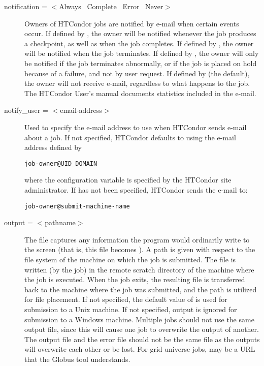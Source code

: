 \begin{description}

\label{man-condor-submit-notification}
\item[notification = $<$Always \Bar\ Complete \Bar\ Error \Bar\ Never$>$]
Owners of HTCondor jobs are notified by
e-mail when certain events occur.
If defined by , the owner will be notified
whenever the job produces a checkpoint, as well as when the job completes.
If defined by , the owner will
be notified when the job terminates.
If defined by , the owner will only be notified
if the job terminates abnormally,
or if the job is placed on hold because of a failure, and not by user request.
If defined by  (the default), the owner will not receive e-mail,
regardless to what happens to the job.
The HTCondor User's manual documents statistics included in the e-mail.


\label{man-condor-submit-notify-user}
\item[notify\_user = $<$email-address$>$]
Used to specify the e-mail
address to use when HTCondor sends e-mail about a job.  If not specified,
HTCondor defaults to using the e-mail address defined by
\begin{verbatim}
job-owner@UID_DOMAIN
\end{verbatim}
where the configuration variable 
is specified by the HTCondor site administrator.
If  has not been specified,
HTCondor sends the e-mail to:
\begin{verbatim}
job-owner@submit-machine-name
\end{verbatim}


\label{man-condor-submit-output}
\item[output = $<$pathname$>$]
The  file captures
any information the program would ordinarily write to the screen
(that is, this file becomes ).
A path is given with respect to the file system of the machine
on which the job is submitted.
The file is written (by the job)
in the remote scratch directory of the machine where the job is executed. 
When the job exits, the resulting file is transferred back to the machine
where the job was submitted, and the path is utilized for file placement.
If not specified, the default value of
 is used for submission to a Unix machine.
If not specified, output is ignored
for submission to a Windows machine.
Multiple jobs should not use the same output
file, since this will cause one job to overwrite the output of
another.
The output file and the error file should not be the same file
as the outputs will overwrite each other or be lost.
For grid universe jobs,  may be a URL that the Globus
tool  understands.


\end{description}
